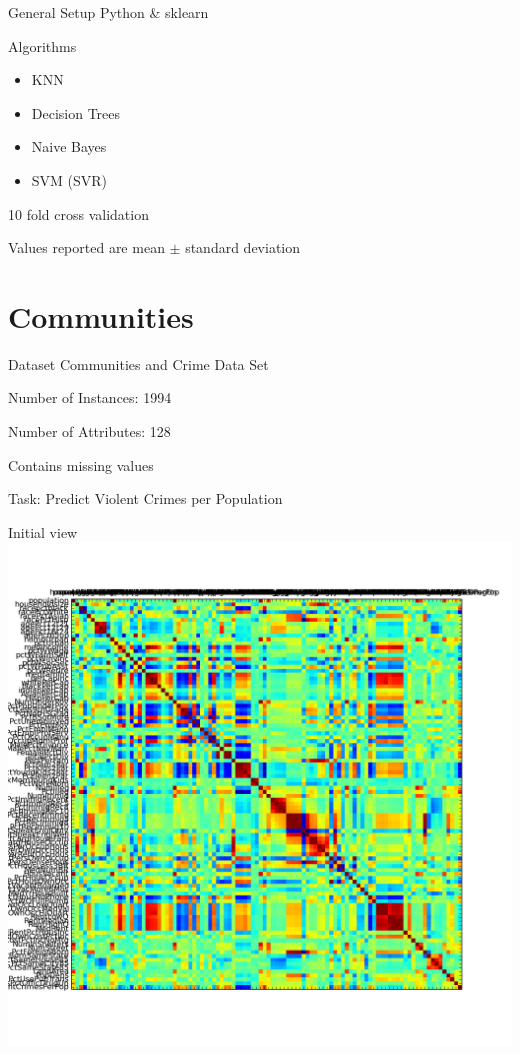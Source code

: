 \documentclass[12pt]{beamer}
\author{Martin Dobiasch \& Eugen Havasi \& Peter Rjabcsenko}
\begin{document}
\begin{frame}
\titlepage
\end{frame}


\begin{frame}{General Setup}
Python \& sklearn

\begin{block}{Algorithms}
\begin{itemize}
\item KNN
\item Decision Trees
\item Naive Bayes
\item SVM (SVR)
\end{itemize}
\end{block}

10 fold cross validation

Values reported are mean $\pm$ standard deviation

\end{frame}

\section{Communities}
\begin{frame}{Dataset}
Communities and Crime Data Set

Number of Instances: 1994

Number of Attributes: 128

Contains missing values

Task: Predict Violent Crimes per Population
\end{frame}

\begin{frame}{Initial view}
\includegraphics[height=\textheight,width=\textwidth,keepaspectratio]{plots/communities_orig.png}
\end{frame}
\end{document}
